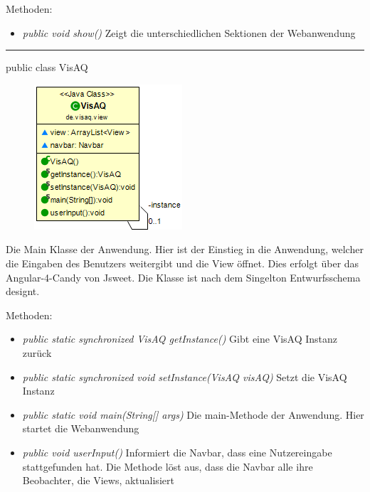 Methoden:
\begin{itemize}
    \item \emph{public void show()} Zeigt die unterschiedlichen Sektionen der Webanwendung
\end{itemize}

\rule{\textwidth}{0.4pt}
public class VisAQ

\begin{minipage}{0.3\textwidth}
    \begin{figure}[H]
        \includegraphics[scale = 0.6]{media/frontend/view/de.view/VisAQ_Class.png}
    \end{figure}
\end{minipage} \hfill
\begin{minipage}{0.6\textwidth}
    Die Main Klasse der Anwendung. Hier ist der Einstieg in die Anwendung, welcher die Eingaben des Benutzers weitergibt und die View öffnet. Dies erfolgt über das \gls{Angular-4-Candy} von \gls{Jsweet}. Die Klasse ist nach dem Singelton Entwurfsschema designt.
\end{minipage}

Methoden:
\begin{itemize}
    \item \emph{public static synchronized VisAQ getInstance()} Gibt eine VisAQ Instanz zurück
    \item \emph{public static synchronized void setInstance(VisAQ visAQ)} Setzt die VisAQ Instanz
    \item \emph{public static void main(String[] args)} Die main-Methode der Anwendung. Hier startet die Webanwendung
    \item \emph{public void userInput()} Informiert die Navbar, dass eine Nutzereingabe stattgefunden hat. Die Methode löst aus, dass die Navbar alle ihre Beobachter, die Views, aktualisiert
\end{itemize}
